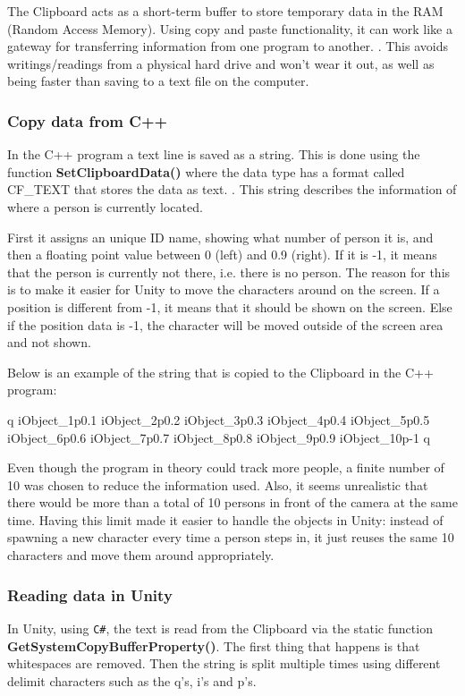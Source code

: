The Clipboard acts as a short-term buffer to store temporary data in the RAM (Random Access Memory). Using copy and paste functionality, it can work like a gateway for transferring information from one program to another. \citep{clipboard_one}. This avoids writings/readings from a physical hard drive and won't wear it out, as well as being faster than saving to a text file on the computer.

\subsubsection{Copy data from C++}
In the C++ program a text line is saved as a string. This is done using the function \textbf{SetClipboardData()} where the data type has a format called CF\_TEXT that stores the data as text.\citep{clipboard_two} \citep{clipboard_three}. This string describes the information of where a person is currently located.

First it assigns an unique ID name, showing what number of person it is, and then a floating point value between 0 (left) and 0.9 (right). If it is -1, it means that the person is currently not there, i.e. there is no person. The reason for this is to make it easier for Unity to move the characters around on the screen. If a position is different from -1, it means that it should be shown on the screen. Else if the position data is -1, the character will be moved outside of the screen area and not shown.

Below is an example of the string that is copied to the Clipboard in the C++ program:

q iObject\_1p0.1 iObject\_2p0.2 iObject\_3p0.3 iObject\_4p0.4 iObject\_5p0.5 iObject\_6p0.6 iObject\_7p0.7 iObject\_8p0.8 iObject\_9p0.9 iObject\_10p-1 q

Even though the program in theory could track more people, a finite number of 10 was chosen to reduce the information used. Also, it seems unrealistic that there would be more than a total of 10 persons in front of the camera at the same time. Having this limit made it easier to handle the objects in Unity: instead of spawning a new character every time a person steps in, it just reuses the same 10 characters and move them around appropriately.

\subsubsection{Reading data in Unity}
In Unity, using \texttt{C\#}, the text is read from the Clipboard via the static function \textbf{GetSystemCopyBufferProperty()}. The first thing that happens is that whitespaces are removed. Then the string is split multiple times using different delimit characters such as the q's, i's and p's.

